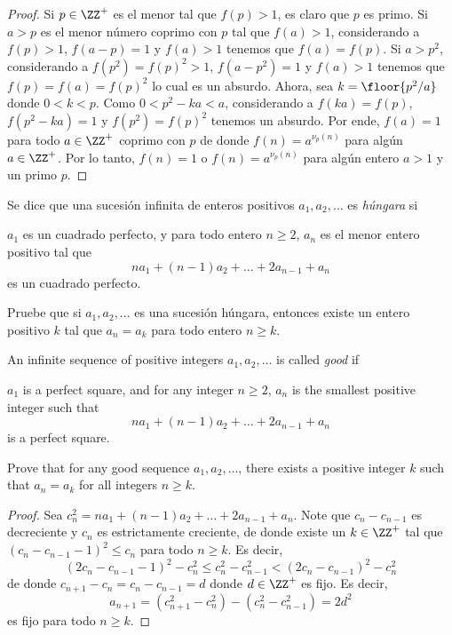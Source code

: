 \begin{proof}
	Si $p\in\ZZ^+$ es el menor tal que $f(p)>1$, es claro que $p$ es primo. Si $a>p$ es el menor número coprimo con $p$ tal que $f(a)>1$, considerando a $f(p)>1$, $f(a-p)=1$ y $f(a)>1$ tenemos que $f(a)=f(p)$. Si $a>p^2$, considerando a $f(p^2)=f(p)^2>1$, $f(a-p^2)=1$ y $f(a)>1$ tenemos que $f(p)=f(a)=f(p)^2$ lo cual es un absurdo. Ahora, sea $k=\floor{p^2/a}$ donde $0<k<p$. Como $0<p^2-ka<a$, considerando a $f(ka)=f(p)$, $f(p^2-ka)=1$ y $f(p^2)=f(p)^2$ tenemos un absurdo. Por ende, $f(a)=1$ para todo $a\in\ZZ^+$ coprimo con $p$ de donde $f(n)=a^{\nu_p(n)}$ para algún $a\in\ZZ^+$. Por lo tanto, $f(n)=1$ o $f(n)=a^{\nu_p(n)}$ para algún entero $a>1$ y un primo $p$.
\end{proof}

\begin{probEG}[EGMO 2022/3]
	Se dice que una sucesión infinita de enteros positivos $a_1,a_2,\dots$ es \emph{húngara} si
	\begin{enumerate}[(1)]
		\ii $a_1$ es un cuadrado perfecto, y
		\ii para todo entero $n\ge 2$, $a_n$ es el menor entero positivo tal que
		\[na_1+(n-1)a_2+\dots+2a_{n-1}+a_n\]
		es un cuadrado perfecto.
	\end{enumerate}
	Pruebe que si $a_1,a_2,\dots$ es una sucesión húngara, entonces existe un entero positivo $k$ tal que $a_n=a_k$ para todo entero $n\ge k$.
	\begin{hint}
		An infinite sequence of positive integers $a_1,a_2,\dots$ is called \emph{good} if
		\begin{enumerate}[(1)]
			\ii $a_1$ is a perfect square, and
			\ii for any integer $n\ge 2$, $a_n$ is the smallest positive integer such that
			\[na_1+(n-1)a_2+\dots+2a_{n-1}+a_n\]
			is a perfect square.
		\end{enumerate}
		Prove that for any good sequence $a_1,a_2,\dots$, there exists a positive integer $k$ such that $a_n=a_k$ for all integers $n\ge k$.
	\end{hint}
\end{probEG}

\begin{proof}
	Sea $c_n^2=na_1+(n-1)a_2+\dots+2a_{n-1}+a_n$. Note que $c_n-c_{n-1}$ es decreciente y $c_n$ es estrictamente creciente, de donde existe un $k\in\ZZ^+$ tal que $(c_n-c_{n-1}-1)^2\le c_n$ para todo $n\ge k$. Es decir,
	\[(2c_n-c_{n-1}-1)^2-c_n^2\le c_n^2-c_{n-1}^2<(2c_n-c_{n-1})^2-c_n^2\]
	de donde $c_{n+1}-c_n=c_n-c_{n-1}=d$ donde $d\in\ZZ^+$ es fijo. Es decir,
	\[a_{n+1}=(c_{n+1}^2-c_n^2)-(c_n^2-c_{n-1}^2)=2d^2\]
	es fijo para todo $n\ge k$.
\end{proof}

